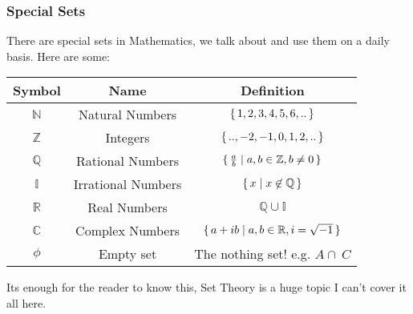 \subsubsection{Special Sets}
There are special sets in Mathematics, we talk about and use them on a daily basis. Here are some:
\begin{center}
\begin{tabular}{| c | c | c | }
\hline
Symbol & Name & Definition \\
\hline
$\mathbb{N}$      & Natural Numbers & $\set{1,2,3,4,5,6,..}$ \\
$\mathbb{Z}$      & Integers  & $\set{..,-2,-1,0,1,2,..}$        \\
$\mathbb{Q}$      & Rational Numbers & $\set{ \frac{a}{b} \mid a,b \in \mathbb{Z}, b \neq 0}$  \\
$\mathbb{I}$      & Irrational Numbers & $\set{ x \mid x \not\in \mathbb{Q}}$ \\
$\mathbb{R}$      & Real Numbers  &  $\mathbb{Q} \cup \mathbb{I}$  \\
$\mathbb{C}$      & Complex Numbers & $\set{a+ib \mid a,b \in \mathbb{R}, i=\sqrt{-1}}$    \\
$\mathbb{\phi}$   & Empty set   &   The nothing set! e.g. $A \cap \  C$ \\
\hline
\end{tabular}
\end{center}
Its enough for the reader to know this, Set Theory is a huge topic I can't cover it all here.
